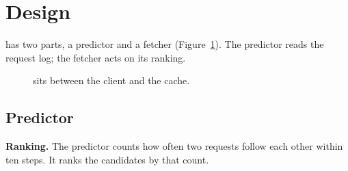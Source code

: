 \section{Design}
\label{sec:design}

\examplesys{} has two parts, a predictor and a fetcher (Figure~\ref{fig:arch}).
The predictor reads the request log; the fetcher acts on its ranking.

\begin{figure}[t]
\centering

\caption{\examplesys{} sits between the client and the cache.}
\label{fig:arch}
\end{figure}

\subsection{Predictor}
\textbf{Ranking.} The predictor counts how often two requests follow each other within ten steps.
It ranks the candidates by that count.
